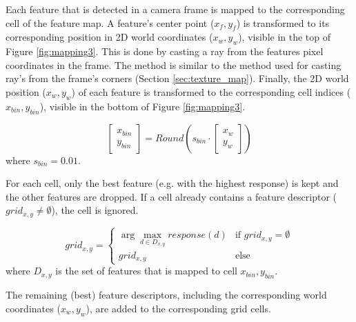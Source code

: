 Each feature that is detected in a camera frame is mapped to the corresponding cell of the feature map.
A feature's center point ($x_f, y_f$) is transformed to its corresponding position in 2D world coordinates ($x_w, y_w$), visible in the top of Figure \ref{fig:mapping3}.
This is done by casting a ray from the features pixel coordinates in the frame.
The method is similar to the method used for casting ray's from the frame's corners (Section \ref{sec:texture_map}).
Finally, the 2D world position ($x_w, y_w$) of each feature is transformed to the corresponding cell indices ($x_{bin}, y_{bin}$), visible in the bottom of Figure \ref{fig:mapping3}.

\begin{equation}
\left[ {
\begin{array}{c} x_{bin} \\ y_{bin} \end{array}
} \right]
=
Round(
s_{bin}
\cdot
\left[ {
\begin{array}{c} x_{w} \\ y_{w} \end{array}
} \right]
)
\end{equation}
where $s_{bin} = 0.01$.

For each cell, only the best feature (e.g. with the highest response) is kept and the other features are dropped.
If a cell already contains a feature descriptor ($grid_{x,y} \neq \emptyset$), the cell is ignored.

\begin{equation}
grid_{x,y} = 
\begin{cases}
\arg\max_{d \in D_{x,y}} response(d) & \mbox{if }  grid_{x,y} = \emptyset \\
grid_{x,y}   &   \mbox{else}
\end{cases} 
\end{equation}
where $D_{x,y}$ is the set of features that is mapped to cell $x_{bin} ,y_{bin}$.

The remaining (best) feature descriptors, including the corresponding world coordinates ($x_w, y_w$), are added to the corresponding grid cells.

